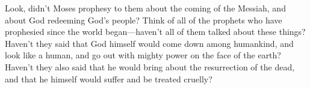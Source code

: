 \bverse \iffalse For behold, did not Moses prophesy unto them concerning the coming of the Messiah, and that God should redeem his people?  Yea, and even all the prophets who have prophesied ever since the world began--have they not spoken more or less concerning these things? \fi
Look, didn't Moses prophesy to them about the coming of the Messiah, and about God redeeming God's people? Think of all of the prophets who have prophesied since the world began---haven't all of them talked about these things?
\bverse \iffalse Have they not said that God himself should come down among the children of men, and take upon him the form of man, and go forth in mighty power upon the face of the earth? \fi
Haven't they said that God himself would come down among humankind, and look like a human, and go out with mighty power on the face of the earth? 
\bverse \iffalse Yea, and have they not said also that he should bring to pass the resurrection of the dead, and that he, himself, should be oppressed and afflicted? \fi
Haven't they also said that he would bring about the resurrection of the dead, and that he himself would suffer and be treated cruelly?

